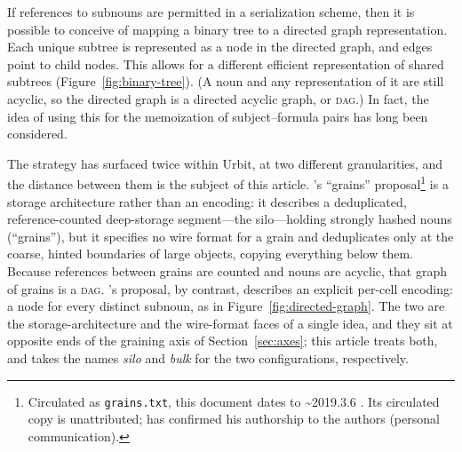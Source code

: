 \documentclass[twoside]{article}
\begin{document}
If references to subnouns are permitted in a serialization scheme, then it is possible to conceive of mapping a binary tree to a directed graph representation.  Each unique subtree is represented as a node in the directed graph, and edges point to child nodes.  This allows for a different efficient representation of shared subtrees (Figure~\ref{fig:binary-tree}).  (A noun and any representation of it are still acyclic, so the directed graph is a directed acyclic graph, or \textsc{dag}.)  In fact, the idea of using this for the memoization of subject--formula pairs has long been considered.

\sloppy
The strategy has surfaced twice within Urbit, at two different granularities, and the distance between them is the subject of this article.  's ``grains'' proposal\footnote{Circulated as \texttt{grains.txt}, this document dates to \textasciitilde 2019.3.6 \citep{Yarvin2019grains}.  Its circulated copy is unattributed;  has confirmed his authorship to the authors (personal communication).} is a storage architecture rather than an encoding:  it describes a deduplicated, reference-counted deep-storage segment---the silo---holding strongly hashed nouns (``grains''), but it specifies no wire format for a grain and deduplicates only at the coarse, hinted boundaries of large objects, copying everything below them.  Because references between grains are counted and nouns are acyclic, that graph of grains is a \textsc{dag}.  's proposal, by contrast, describes an explicit per-cell encoding:  a node for every distinct subnoun, as in Figure~\ref{fig:directed-graph}.  The two are the storage-architecture and the wire-format faces of a single idea, and they sit at opposite ends of the graining axis of Section~\ref{sec:axes}; this article treats both, and takes the names \emph{silo} and \emph{bulk} for the two configurations, respectively.
\end{document}

